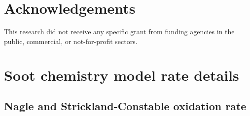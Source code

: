 \documentclass[preprint,12pt,letterpaper]{elsarticle}
\begin{document}

\section*{Acknowledgements}

This research did not receive any specific grant from funding agencies in the public, commercial, or not-for-profit sectors.







%
%
%

\appendix

\section{Soot chemistry model rate details}

\subsection{Nagle and Strickland-Constable oxidation rate}
\label{a:NSC}
\end{document}
